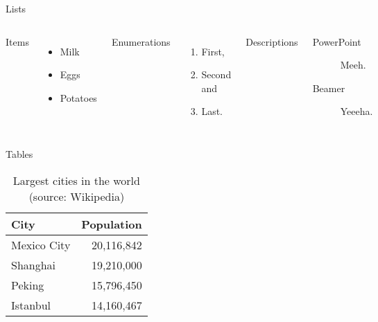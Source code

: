 \begin{frame}{Lists}
	\begin{columns}[T,onlytextwidth]
		Items
		\begin{itemize}
			\item Milk \item Eggs \item Potatoes
		\end{itemize}
		
		Enumerations
		\begin{enumerate}
			\item First, \item Second and \item Last.
		\end{enumerate}
		
		Descriptions
		\begin{description}
			\item[PowerPoint] Meeh. \item[Beamer] Yeeeha.
		\end{description}
	\end{columns}
\end{frame}
\begin{frame}{Tables}
	\begin{table}
		\caption{Largest cities in the world (source: Wikipedia)}
		\begin{tabular}{@{} lr @{}}
			\toprule
			City & Population\\
			\midrule
			Mexico City & 20,116,842\\
			Shanghai & 19,210,000\\
			Peking & 15,796,450\\
			Istanbul & 14,160,467\\
			\bottomrule
		\end{tabular}
	\end{table}
\end{frame}

